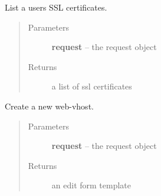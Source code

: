 \documentclass[letterpaper,10pt,english]{sphinxmanual}
\begin{document}

\begin{fulllineitems}
\label{api/web:limeade.web.views.sslcert_list}
List a users SSL certificates.
\begin{quote}\begin{description}
\item[{Parameters}] \leavevmode
\textbf{request} -- the request object

\item[{Returns}] \leavevmode
a list of ssl certificates

\end{description}\end{quote}

\end{fulllineitems}


\begin{fulllineitems}
\label{api/web:limeade.web.views.vhost_add}
Create a new web-vhost.
\begin{quote}\begin{description}
\item[{Parameters}] \leavevmode
\textbf{request} -- the request object

\item[{Returns}] \leavevmode
an edit form template

\end{description}\end{quote}

\end{fulllineitems}

\end{document}
